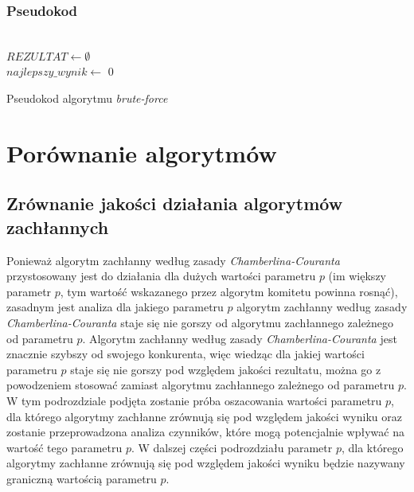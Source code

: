 \documentclass[pdflatex,11pt]{../aghdoc_version2}
\begin{document}
\subsection{Pseudokod}

\begin{algorithm}[H]
\SetAlgoLined
{}
~\\
$REZULTAT \longleftarrow \emptyset $ \\
$najlepszy\_wynik \longleftarrow $ 0 \\
\caption{Pseudokod algorytmu \textit{brute-force}}
\end{algorithm}


\chapter{Porównanie algorytmów}
\section{Zrównanie jakości działania algorytmów zachłannych}
Ponieważ algorytm zachłanny według zasady \textit{Chamberlina-Couranta} przystosowany jest do
działania dla dużych wartości parametru $p$ (im większy parametr $p$, tym wartość wskazanego przez algorytm komitetu powinna rosnąć), zasadnym jest analiza dla jakiego parametru $p$ algorytm zachłanny
według zasady \textit{Chamberlina-Couranta} staje się nie gorszy od algorytmu zachłannego zależnego
od parametru $p$. Algorytm zachłanny według zasady \textit{Chamberlina-Couranta} jest znacznie szybszy od swojego konkurenta, więc wiedząc dla jakiej wartości parametru $p$ staje się nie gorszy pod względem jakości rezultatu, można go z powodzeniem stosować zamiast algorytmu zachłannego zależnego od parametru $p$. W tym podrozdziale podjęta zostanie próba oszacowania wartości parametru $p$, dla którego algorytmy zachłanne zrównują się pod względem jakości wyniku oraz zostanie przeprowadzona analiza czynników, które mogą potencjalnie wpływać na wartość tego parametru $p$. W dalszej części podrozdziału parametr $p$, dla którego algorytmy zachłanne zrównują się pod względem jakości wyniku będzie nazywany graniczną wartością parametru $p$.
\end{document}

